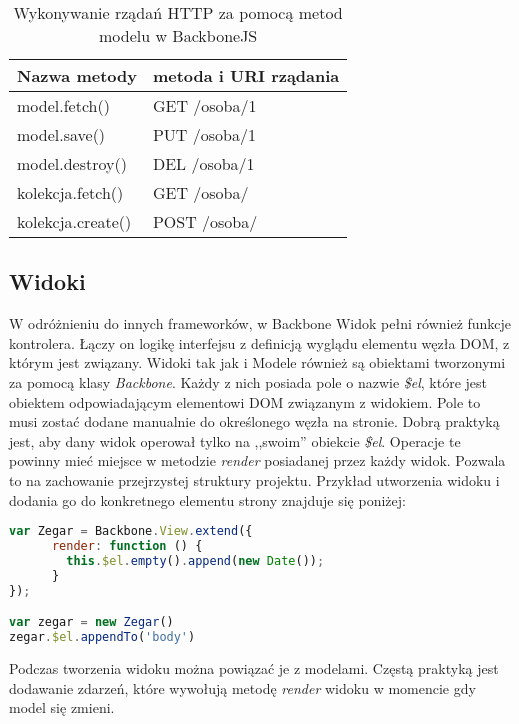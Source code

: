 \begin{table}[h]
	\caption{Wykonywanie rządań HTTP za pomocą metod modelu w BackboneJS}
	\label{tab:heading-styles}
	\begin{tabularx}{\textwidth}{|X|X|}
		\hline
		Nazwa metody 						& metoda i URI rządania 	\\ 
		\hline
		model.fetch()		 				& GET /osoba/1 	\\ 
		\hline
		model.save()						& PUT /osoba/1  \\ 
		\hline
		model.destroy() 					& DEL /osoba/1 \\ 
		\hline
		kolekcja.fetch()					& GET /osoba/  \\ 
		\hline
		kolekcja.create() 					& POST /osoba/ \\ 
		\hline
	\end{tabularx}
\end{table}


\subsection{Widoki}
W odróżnieniu do innych frameworków, w Backbone Widok pełni również funkcje kontrolera. Łączy on logikę interfejsu z definicją wyglądu elementu węzła DOM, z którym jest związany. Widoki tak jak i Modele również są obiektami tworzonymi za pomocą klasy \textit{Backbone}. Każdy z nich posiada pole o nazwie \textit{\$el}, które jest obiektem odpowiadającym elementowi DOM związanym z widokiem. Pole to musi zostać dodane manualnie do określonego węzła na stronie. Dobrą praktyką jest, aby dany widok operował tylko na ,,swoim'' obiekcie \textit{\$el}. Operacje te powinny mieć miejsce w metodzie \textit{render} posiadanej przez każdy widok. Pozwala to na zachowanie przejrzystej struktury projektu. Przykład utworzenia widoku i dodania go do konkretnego elementu strony znajduje się poniżej:

\begin{lstlisting}[language=JavaScript]
var Zegar = Backbone.View.extend({ 
	  render: function () {
	  	this.$el.empty().append(new Date());
  	  }
});

var zegar = new Zegar()
zegar.$el.appendTo('body')
\end{lstlisting}

Podczas tworzenia widoku można powiązać je z modelami. Częstą praktyką jest dodawanie zdarzeń, które wywołują metodę \textit{render} widoku w momencie gdy model się zmieni.





